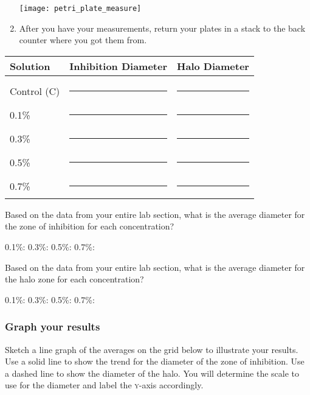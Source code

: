 \documentclass[12pt]{exam}
\begin{document}
\begin{questions}
\begin{enumerate}
		{\centering\texttt{[image: petri\_plate\_measure]}\par
		}

	\item After you have your measurements, return your plates in a stack to the back counter where you got them from.
	
\end{enumerate}

\begin{longtable}[c]{lcc}
	\toprule
		Solution	&	Inhibition Diameter	&	Halo Diameter \tabularnewline
	\midrule
		& & \tabularnewline[0.75em]
		Control (C)	& \rule{0.75in}{0.4pt} & \rule{0.75in}{0.4pt} \tabularnewline[2em]
		0.1\%	& \rule{0.75in}{0.4pt} & \rule{0.75in}{0.4pt} \tabularnewline[2em]
		0.3\%	& \rule{0.75in}{0.4pt} & \rule{0.75in}{0.4pt} \tabularnewline[2em]
		0.5\%	& \rule{0.75in}{0.4pt} & \rule{0.75in}{0.4pt} \tabularnewline[2em]
		0.7\%	& \rule{0.75in}{0.4pt} & \rule{0.75in}{0.4pt} \tabularnewline
	\bottomrule
\end{longtable}

\question
Based on the data from your entire lab section, what is the average diameter for the zone of inhibition for each concentration?

\vspace*{0.5\baselineskip}

0.1\%: \hfill 0.3\%: \hfill 0.5\%: \hfill 0.7\%: \hfill \phantom{|}

\vspace{0.5\baselineskip}

\question
Based on the data from your entire lab section, what is the average diameter for the halo zone for each concentration?

\vspace*{0.5\baselineskip}

0.1\%: \hfill 0.3\%: \hfill 0.5\%: \hfill 0.7\%: \hfill \phantom{|}

\vspace{0.5\baselineskip}


\subsubsection*{Graph your results}

Sketch a line graph of the averages on the grid below to illustrate your results. Use a solid line to show the trend for the diameter of the zone of inhibition. Use a dashed line to show the diameter of the halo. You will determine the scale to use for the diameter and label the \textsc{y}-axis accordingly.


\end{questions}
\end{document}
